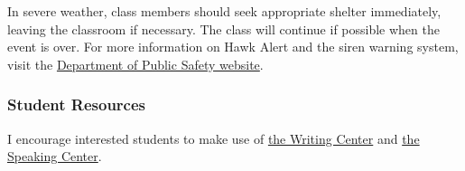 \documentclass[]{article}
\begin{document}
In severe weather, class members should seek appropriate shelter
immediately, leaving the classroom if necessary. The class will continue
if possible when the event is over. For more information on Hawk Alert
and the siren warning system, visit the
\href{https://police.uiowa.edu/emergency-communications}{Department of
Public Safety website}.

\hypertarget{student-resources}{%
\subsubsection{Student Resources}\label{student-resources}}

I encourage interested students to make use of
\href{http://www.uiowa.edu/~writingc/}{the Writing Center} and
\href{https://tippie.uiowa.edu/clas/scheduler/logon.aspx?}{the Speaking
Center}.
\end{document}
